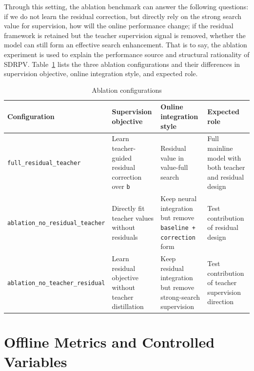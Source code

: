Through this setting, the ablation benchmark can answer the following questions: if we do not learn the residual correction, but directly rely on the strong search value for supervision, how will the online performance change; if the residual framework is retained but the teacher supervision signal is removed, whether the model can still form an effective search enhancement. That is to say, the ablation experiment is used to explain the performance source and structural rationality of SDRPV.
Table~\ref{tab:ablation_configurations} lists the three ablation configurations and their differences in supervision objective, online integration style, and expected role.

\begin{table}[htbp]
\centering
\caption{Ablation configurations}
\label{tab:ablation_configurations}
\begin{tabular}{p{3.2cm}p{3.5cm}p{3.6cm}p{3.2cm}}
\toprule
Configuration & Supervision objective & Online integration style & Expected role \\
\midrule
\texttt{full\_residual\_teacher} & Learn teacher-guided residual correction over \texttt{b} & Residual value in value-full search & Full mainline model with both teacher and residual design \\
\texttt{ablation\_no\_residual\_teacher} & Directly fit teacher values without residuals & Keep neural integration but remove \texttt{baseline + correction} form & Test contribution of residual design \\
\texttt{ablation\_no\_teacher\_residual} & Learn residual objective without teacher distillation & Keep residual integration but remove strong-search supervision & Test contribution of teacher supervision direction \\
\bottomrule
\end{tabular}
\end{table}


\section{Offline Metrics and Controlled Variables}


